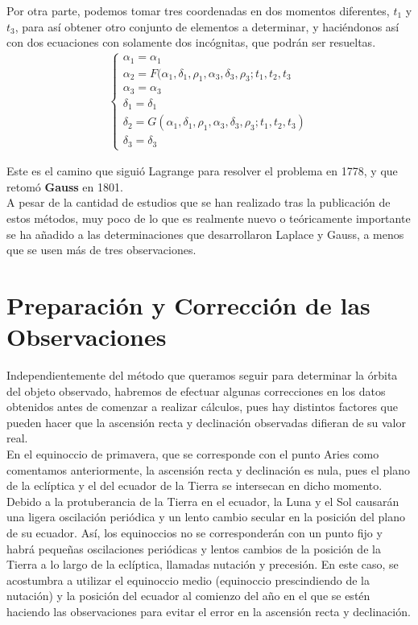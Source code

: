 \documentclass[11pt]{book}
\begin{document}
Por otra parte, podemos tomar tres coordenadas en dos momentos diferentes, $t_1$ y $t_3$, para así obtener otro conjunto de elementos a determinar, y haciéndonos así con dos ecuaciones con solamente dos incógnitas, que podrán ser resueltas.
\begin{align}
\left\{\begin{array}{l}
	\alpha_1 = \alpha_1\\
	\alpha_2 = F(\alpha_1, \delta_1, \rho_1, \alpha_3, \delta_3, \rho_3; t_1, t_2, t_3\\
	\alpha_3 = \alpha_3\\
	\delta_1 = \delta_1\\
	\delta_2 = G(\alpha_1, \delta_1, \rho_1, \alpha_3, \delta_3, \rho_3; t_1, t_2, t_3)\\
	\delta_3 = \delta_3
\end{array}
\right.
\label{eq:camino_gauss}
\end{align}

Este es el camino que siguió Lagrange para resolver el problema en 1778, y que retomó \textbf{Gauss} en 1801.\\

A pesar de la cantidad de estudios que se han realizado tras la publicación de estos métodos, muy poco de lo que es realmente nuevo o teóricamente importante se ha añadido a las determinaciones que desarrollaron Laplace y Gauss, a menos que se usen más de tres observaciones.\\


\section{Preparación y Corrección de las Observaciones}
Independientemente del método que queramos seguir para determinar la órbita del objeto observado, habremos de efectuar algunas correcciones en los datos obtenidos antes de comenzar a realizar cálculos, pues hay distintos factores que pueden hacer que la ascensión recta y declinación observadas difieran de su valor real.\\

En el equinoccio de primavera, que se corresponde con el punto Aries como comentamos anteriormente, la ascensión recta y declinación es nula, pues el plano de la eclíptica y el del ecuador de la Tierra se intersecan en dicho momento. Debido a la protuberancia de la Tierra en el ecuador, la Luna y el Sol causarán una ligera oscilación periódica y un lento cambio secular en la posición del plano de su ecuador. Así, los equinoccios no se corresponderán con un punto fijo y habrá pequeñas oscilaciones periódicas y lentos cambios de la posición de la Tierra a lo largo de la eclíptica, llamadas nutación y precesión. En este caso, se acostumbra a utilizar el equinoccio medio (equinoccio prescindiendo de la nutación) y la posición del ecuador al comienzo del año en el que se estén haciendo las observaciones para evitar el error en la ascensión recta y declinación.\\
\end{document}
